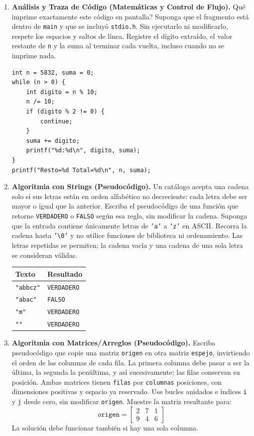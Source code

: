 \documentclass[11pt,letterpaper]{article}
\begin{document}
\begin{enumerate}[label=\textbf{\arabic*.}]
    \newpage
    \item \textbf{Análisis y Traza de Código (Matemáticas y Control de Flujo).}
    \textquestiondown{}Qué imprime exactamente este código en pantalla? Suponga que el fragmento está dentro de \texttt{main} y que se incluyó \texttt{stdio.h}. Sin ejecutarlo ni modificarlo, respete los espacios y saltos de línea. Registre el dígito extraído, el valor restante de \texttt{n} y la suma al terminar cada vuelta, incluso cuando no se imprime nada.
    \begin{lstlisting}[style=customc]
int n = 5832, suma = 0;
while (n > 0) {
    int digito = n % 10;
    n /= 10;
    if (digito % 2 != 0) {
        continue;
    }
    suma += digito;
    printf("%d:%d\n", digito, suma);
}
printf("Resto=%d Total=%d\n", n, suma);
    \end{lstlisting}

    \newpage
    \item \textbf{Algoritmia con Strings (Pseudocódigo).}
    Un catálogo acepta una cadena solo si sus letras están en orden alfabético no decreciente: cada letra debe ser mayor o igual que la anterior. Escriba el pseudocódigo de una función que retorne \texttt{VERDADERO} o \texttt{FALSO} según esa regla, sin modificar la cadena.
    Suponga que la entrada contiene únicamente letras de \texttt{'a'} a \texttt{'z'} en ASCII. Recorra la cadena hasta \texttt{'\textbackslash 0'} y no utilice funciones de biblioteca ni ordenamiento. Las letras repetidas se permiten; la cadena vacía y una cadena de una sola letra se consideran válidas.
    \begin{center}
    \begin{tabular}{ll}
    \toprule
    \textbf{Texto} & \textbf{Resultado} \\
    \midrule
    \texttt{"abbcz"} & \texttt{VERDADERO} \\
    \texttt{"abac"} & \texttt{FALSO} \\
    \texttt{"m"} & \texttt{VERDADERO} \\
    \texttt{""} & \texttt{VERDADERO} \\
    \bottomrule
    \end{tabular}
    \end{center}

    \newpage
    \item \textbf{Algoritmia con Matrices/Arreglos (Pseudocódigo).}
    Escriba pseudocódigo que copie una matriz \texttt{origen} en otra matriz \texttt{espejo}, invirtiendo el orden de las columnas de cada fila. La primera columna debe pasar a ser la última, la segunda la penúltima, y así sucesivamente; las filas conservan su posición.
    Ambas matrices tienen \texttt{filas} por \texttt{columnas} posiciones, con dimensiones positivas y espacio ya reservado. Use bucles anidados e índices \texttt{i} y \texttt{j} desde cero, sin modificar \texttt{origen}. Muestre la matriz resultante para:
    \[
    \texttt{origen} =
    \begin{bmatrix}
    2 & 7 & 1 \\
    9 & 4 & 6
    \end{bmatrix}
    \]
    La solución debe funcionar también si hay una sola columna.
\end{enumerate}
\end{document}
